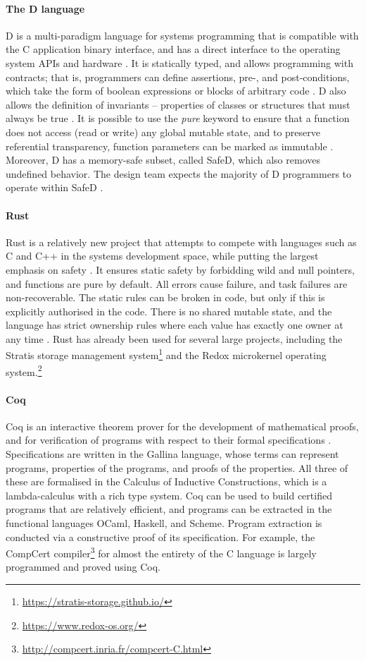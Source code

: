 \paragraph{The D language}
D is a multi-paradigm language for systems programming that is compatible with the C application binary interface, and has a direct interface to the operating system APIs and hardware \cite{dlangTour}.
It is statically typed, and allows programming with contracts; that is, programmers can define assertions, pre-, and post-conditions, which take the form of boolean expressions or blocks of arbitrary code \cite{dlangContracts}.
D also allows the definition of invariants -- properties of classes or structures that must always be true \cite{dlangContracts}.
It is possible to use the \textit{pure} keyword to ensure that a function does not access (read or write) any global mutable state, and to preserve referential transparency, function parameters can be marked as immutable \cite{nadlinger2012}.
Moreover, D has a memory-safe subset, called SafeD, which also removes undefined behavior.
The design team expects the majority of D programmers to operate within SafeD \cite{milewski}.

\paragraph{Rust}
Rust is a relatively new project that attempts to compete with languages such as C and C++ in the systems development space, while putting the largest emphasis on safety \cite{hoare2010}.
It ensures static safety by forbidding wild and null pointers, and functions are pure by default.
All errors cause failure, and task failures are non-recoverable.
The static rules can be broken in code, but only if this is explicitly authorised in the code.
There is no shared mutable state, and the language has strict ownership rules where each value has exactly one owner at any time \cite{klabnik2019}.
Rust has already been used for several large projects, including the Stratis storage management system\footnote{\url{https://stratis-storage.github.io/}} and the Redox microkernel operating system.\footnote{\url{https://www.redox-os.org/}}

\paragraph{Coq}
Coq is an interactive theorem prover for the development of mathematical proofs, and for verification of programs with respect to their formal specifications \cite{coqRM}.
Specifications are written in the Gallina language, whose terms can represent programs, properties of the programs, and proofs of the properties.
All three of these are formalised in the Calculus of Inductive Constructions, which is a lambda-calculus with a rich type system.
Coq can be used to build certified programs that are relatively efficient, and programs can be extracted in the functional languages OCaml, Haskell, and Scheme.
Program extraction is conducted via a constructive proof of its specification.
For example, the CompCert compiler\footnote{\url{http://compcert.inria.fr/compcert-C.html}} for almost the entirety of the C language is largely programmed and proved using Coq.

